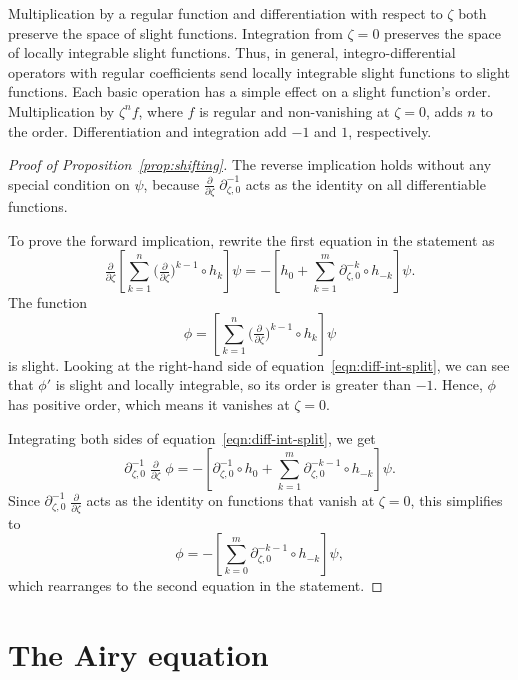 \documentclass{article}
\theoremstyle{plain}
\newcommand{\fracderiv}[3]{\partial^{#1}_{#2, #3}}
\begin{document}
Multiplication by a regular function and differentiation with respect to $\zeta$ both preserve the space of slight functions. Integration from $\zeta = 0$ preserves the space of locally integrable slight functions. Thus, in general, integro-differential operators with regular coefficients send locally integrable slight functions to slight functions. Each basic operation has a simple effect on a slight function's order. Multiplication by $\zeta^n f$, where $f$ is regular and non-vanishing at $\zeta = 0$, adds $n$ to the order. Differentiation and integration add $-1$ and $1$, respectively.
\begin{proof}[Proof of Proposition~\ref{prop:shifting}]
The reverse implication holds without any special condition on $\psi$, because $\tfrac{\partial}{\partial \zeta}\;\fracderiv{-1}{\zeta}{0}$ acts as the identity on all differentiable functions.

To prove the forward implication, rewrite the first equation in the statement as
\begin{equation}\label{eqn:diff-int-split}
\tfrac{\partial}{\partial \zeta} \left[ \sum_{k = 1}^n \big(\tfrac{\partial}{\partial \zeta}\big)^{k-1} \circ h_k \right] \psi = -\left[ h_0 + \sum_{k = 1}^m \fracderiv{-k}{\zeta}{0} \circ h_{-k} \right] \psi.
\end{equation}
The function
\[ \phi = \left[ \sum_{k = 1}^n \big(\tfrac{\partial}{\partial \zeta}\big)^{k-1} \circ h_k \right] \psi \]
is slight. Looking at the right-hand side of equation~\ref{eqn:diff-int-split}, we can see that $\phi'$ is slight and locally integrable, so its order is greater than $-1$. Hence, $\phi$ has positive order, which means it vanishes at $\zeta = 0$.

Integrating both sides of equation~\ref{eqn:diff-int-split}, we get
\[ \fracderiv{-1}{\zeta}{0}\;\tfrac{\partial}{\partial \zeta}\;\phi = -\left[ \fracderiv{-1}{\zeta}{0} \circ h_0 + \sum_{k = 1}^m \fracderiv{-k-1}{\zeta}{0} \circ h_{-k} \right] \psi. \]
Since $\fracderiv{-1}{\zeta}{0}\;\tfrac{\partial}{\partial \zeta}$ acts as the identity on functions that vanish at $\zeta = 0$, this simplifies to
\[ \phi = -\left[ \sum_{k = 0}^m \fracderiv{-k-1}{\zeta}{0} \circ h_{-k} \right] \psi, \]
which rearranges to the second equation in the statement.
\end{proof}
\section{The Airy equation}
\end{document}
